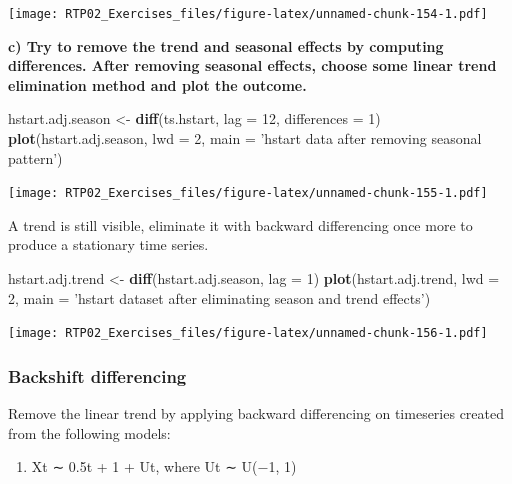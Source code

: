 \documentclass[
]{article}
\newenvironment{Shaded}{\begin{snugshade}}{\end{snugshade}}
\newcommand{\DataTypeTok}[1]{\textcolor[rgb]{0.13,0.29,0.53}{#1}}
\newcommand{\DecValTok}[1]{\textcolor[rgb]{0.00,0.00,0.81}{#1}}
\newcommand{\KeywordTok}[1]{\textcolor[rgb]{0.13,0.29,0.53}{\textbf{#1}}}
\newcommand{\NormalTok}[1]{#1}
\newcommand{\StringTok}[1]{\textcolor[rgb]{0.31,0.60,0.02}{#1}}
\providecommand{\tightlist}{%
  \setlength{\itemsep}{0pt}\setlength{\parskip}{0pt}}
\begin{document}
\texttt{[image: RTP02\_Exercises\_files/figure-latex/unnamed-chunk-154-1.pdf]}

\textbf{c) Try to remove the trend and seasonal effects by computing
differences. After removing seasonal effects, choose some linear trend
elimination method and plot the outcome.}

\begin{Shaded}
\begin{Highlighting}[]
\NormalTok{hstart.adj.season <-}\StringTok{ }\KeywordTok{diff}\NormalTok{(ts.hstart, }\DataTypeTok{lag =} \DecValTok{12}\NormalTok{, }\DataTypeTok{differences =} \DecValTok{1}\NormalTok{)}
\KeywordTok{plot}\NormalTok{(hstart.adj.season, }\DataTypeTok{lwd =} \DecValTok{2}\NormalTok{, }\DataTypeTok{main =} \StringTok{'hstart data after removing seasonal pattern'}\NormalTok{)}
\end{Highlighting}
\end{Shaded}

\texttt{[image: RTP02\_Exercises\_files/figure-latex/unnamed-chunk-155-1.pdf]}

A trend is still visible, eliminate it with backward differencing once
more to produce a stationary time series.

\begin{Shaded}
\begin{Highlighting}[]
\NormalTok{hstart.adj.trend <-}\StringTok{ }\KeywordTok{diff}\NormalTok{(hstart.adj.season, }\DataTypeTok{lag =} \DecValTok{1}\NormalTok{)}
\KeywordTok{plot}\NormalTok{(hstart.adj.trend, }\DataTypeTok{lwd =} \DecValTok{2}\NormalTok{, }\DataTypeTok{main =} \StringTok{'hstart dataset after eliminating season and trend effects'}\NormalTok{)}
\end{Highlighting}
\end{Shaded}

\texttt{[image: RTP02\_Exercises\_files/figure-latex/unnamed-chunk-156-1.pdf]}

\hypertarget{backshift-differencing}{%
\subsubsection{Backshift differencing}\label{backshift-differencing}}

Remove the linear trend by applying backward differencing on timeseries
created from the following models:

\begin{enumerate}
\def\labelenumi{\alph{enumi})}
\tightlist
\item
  Xt ∼ 0.5t + 1 + Ut, where Ut ∼ U(−1, 1)
\end{enumerate}
\end{document}
